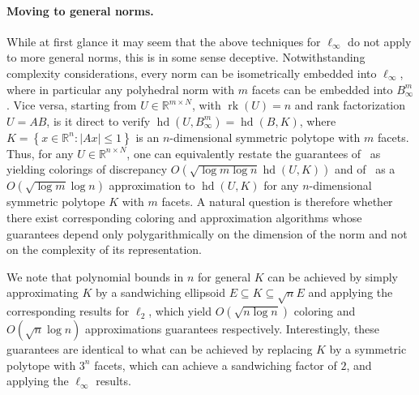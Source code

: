 \documentclass[11pt]{article}
\newcommand{\R}{{\mathbb{R}}}
\newcommand{\set}[1]{\left\{ #1 \right\}}
\DeclareMathOperator{\hd}{hd}
\DeclareMathOperator{\rank}{rk}
\begin{document}
\paragraph{\bf Moving to general norms.} While at first glance it may seem that
the above techniques for $\ell_\infty$ do not apply to more general norms, this
is in some sense deceptive. Notwithstanding complexity considerations, every
norm can be isometrically embedded into $\ell_\infty$, where in particular any
polyhedral norm with $m$ facets can be embedded into $B^m_\infty$. Vice versa,
starting from $U \in \R^{m \times N}$, with $\rank(U) = n$ and rank
factorization $U = A B$, is it direct to verify $\hd(U,B^m_\infty) = \hd(B,K)$,
where $K = \set{x \in \R^n: |Ax| \leq 1}$ is an $n$-dimensional symmetric
polytope with $m$ facets. Thus, for any $U \in \R^{n \times N}$, one can
equivalently restate the guarantees of~\cite{Bansal10} as yielding colorings of
discrepancy $O(\sqrt{\log m \log n} \hd(U,K))$ and of~\cite{disc-gamma2} as a
$O(\sqrt{\log m}\log n)$ approximation to $\hd(U,K)$ for any $n$-dimensional
symmetric polytope $K$ with $m$ facets. A natural question is therefore
whether there exist corresponding coloring and approximation algorithms whose
guarantees depend only polygarithmically on the dimension of the norm and not on
the complexity of its representation. 

We note that polynomial bounds in $n$ for general $K$ can be achieved by simply
approximating $K$ by a sandwiching ellipsoid $E \subseteq K \subseteq \sqrt{n}
E$ and applying the corresponding results for $\ell_2$, which yield $O(\sqrt{n
\log n})$ coloring and $O(\sqrt{n}\log n)$ approximations guarantees
respectively. Interestingly, these guarantees are identical to what can be
achieved by replacing $K$ by a symmetric polytope with $3^n$ facets, which can
achieve a sandwiching factor of $2$, and applying the $\ell_\infty$ results.
\end{document}
